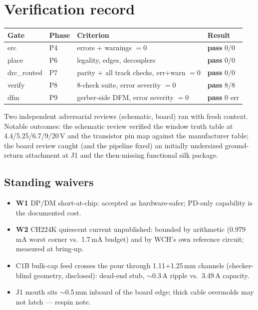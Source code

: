 \documentclass[11pt,a4paper]{article}
\begin{document}
\section{Verification record}
\begin{center}
\begin{tabular}{@{}llll@{}}
\toprule
Gate & Phase & Criterion & Result\\
\midrule
erc & P4 & errors + warnings $=0$ & \textbf{pass} 0/0\\
place & P6 & legality, edges, decouplers & \textbf{pass} 0/0\\
drc\_routed & P7 & parity + all track checks, err+warn $=0$ & \textbf{pass} 0/0\\
verify & P8 & 8-check suite, error severity $=0$ & \textbf{pass} 8/8\\
dfm & P9 & gerber-side DFM, error severity $=0$ & \textbf{pass} 0 err\\
\bottomrule
\end{tabular}
\end{center}

Two independent adversarial reviews (schematic, board) ran with fresh
context. Notable outcomes: the schematic review verified the window
truth table at 4.4/5.25/6.7/9/20\,V and the transistor pin map against the
manufacturer table; the board review caught (and the pipeline fixed) an
initially undersized ground-return attachment at J1 and the then-missing
functional silk package.

\subsection{Standing waivers}
\begin{itemize}\itemsep2pt
  \item \textbf{W1} DP/DM short-at-chip: accepted as hardware-safer;
  PD-only capability is the documented cost.
  \item \textbf{W2} CH224K quiescent current unpublished: bounded by
  arithmetic (0.979\,mA worst corner vs.\ 1.7\,mA budget) and by WCH's own
  reference circuit; measured at bring-up.
  \item C1B bulk-cap feed crosses the pour through 1.11+1.25\,mm channels
  (checker-blind geometry, disclosed): dead-end stub, $\sim$0.3\,A ripple
  vs.\ 3.49\,A capacity.
  \item J1 mouth sits $\sim$0.5\,mm inboard of the board edge; thick
  cable overmolds may not latch --- respin note.
\end{itemize}
\end{document}
